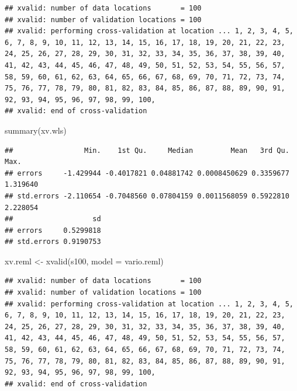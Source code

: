 \documentclass[
  spanish,
]{book}
\newenvironment{Shaded}{\begin{snugshade}}{\end{snugshade}}
\newcommand{\AttributeTok}[1]{\textcolor[rgb]{0.77,0.63,0.00}{#1}}
\newcommand{\FunctionTok}[1]{\textcolor[rgb]{0.00,0.00,0.00}{#1}}
\newcommand{\NormalTok}[1]{#1}
\newcommand{\OtherTok}[1]{\textcolor[rgb]{0.56,0.35,0.01}{#1}}
\theoremstyle{break}
\theoremstyle{definition}
\theoremstyle{definition}
\theoremstyle{definition}
\theoremstyle{definition}
\theoremstyle{remark}
\begin{document}
\begin{verbatim}
## xvalid: number of data locations       = 100
## xvalid: number of validation locations = 100
## xvalid: performing cross-validation at location ... 1, 2, 3, 4, 5, 6, 7, 8, 9, 10, 11, 12, 13, 14, 15, 16, 17, 18, 19, 20, 21, 22, 23, 24, 25, 26, 27, 28, 29, 30, 31, 32, 33, 34, 35, 36, 37, 38, 39, 40, 41, 42, 43, 44, 45, 46, 47, 48, 49, 50, 51, 52, 53, 54, 55, 56, 57, 58, 59, 60, 61, 62, 63, 64, 65, 66, 67, 68, 69, 70, 71, 72, 73, 74, 75, 76, 77, 78, 79, 80, 81, 82, 83, 84, 85, 86, 87, 88, 89, 90, 91, 92, 93, 94, 95, 96, 97, 98, 99, 100, 
## xvalid: end of cross-validation
\end{verbatim}

\begin{Shaded}
\begin{Highlighting}[]
\FunctionTok{summary}\NormalTok{(xv.wls)}
\end{Highlighting}
\end{Shaded}

\begin{verbatim}
##                 Min.    1st Qu.     Median         Mean   3rd Qu.     Max.
## errors     -1.429944 -0.4017821 0.04881742 0.0008450629 0.3359677 1.319640
## std.errors -2.110654 -0.7048560 0.07804159 0.0011568059 0.5922810 2.228054
##                   sd
## errors     0.5299818
## std.errors 0.9190753
\end{verbatim}

\begin{Shaded}
\begin{Highlighting}[]
\NormalTok{xv.reml }\OtherTok{\textless{}{-}} \FunctionTok{xvalid}\NormalTok{(s100, }\AttributeTok{model =}\NormalTok{ vario.reml)}
\end{Highlighting}
\end{Shaded}

\begin{verbatim}
## xvalid: number of data locations       = 100
## xvalid: number of validation locations = 100
## xvalid: performing cross-validation at location ... 1, 2, 3, 4, 5, 6, 7, 8, 9, 10, 11, 12, 13, 14, 15, 16, 17, 18, 19, 20, 21, 22, 23, 24, 25, 26, 27, 28, 29, 30, 31, 32, 33, 34, 35, 36, 37, 38, 39, 40, 41, 42, 43, 44, 45, 46, 47, 48, 49, 50, 51, 52, 53, 54, 55, 56, 57, 58, 59, 60, 61, 62, 63, 64, 65, 66, 67, 68, 69, 70, 71, 72, 73, 74, 75, 76, 77, 78, 79, 80, 81, 82, 83, 84, 85, 86, 87, 88, 89, 90, 91, 92, 93, 94, 95, 96, 97, 98, 99, 100, 
## xvalid: end of cross-validation
\end{verbatim}
\end{document}
